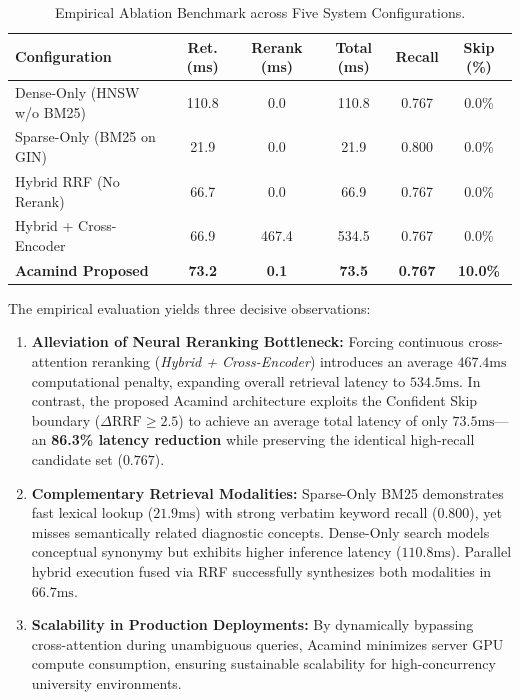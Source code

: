 \documentclass[10pt]{SPIIRAS_Proceedings}
\begin{document}
\begin{table}[!t]
\centering
\caption{Empirical Ablation Benchmark across Five System Configurations.}
\label{tab:ablation}
\scriptsize
\setlength{\tabcolsep}{2.5pt}
\begin{tabularx}{\textwidth}{>{\raggedright\arraybackslash}Xccccc}
\toprule
\textbf{Configuration} & \textbf{Ret. (ms)} & \textbf{Rerank (ms)} & \textbf{Total (ms)} & \textbf{Recall} & \textbf{Skip (\%)} \\
\midrule
Dense-Only (HNSW w/o BM25) & 110.8 & 0.0 & 110.8 & 0.767 & 0.0\% \\
Sparse-Only (BM25 on GIN) & 21.9 & 0.0 & 21.9 & 0.800 & 0.0\% \\
Hybrid RRF (No Rerank) & 66.7 & 0.0 & 66.9 & 0.767 & 0.0\% \\
Hybrid + Cross-Encoder & 66.9 & 467.4 & 534.5 & 0.767 & 0.0\% \\
\midrule
\textbf{Acamind Proposed} & \textbf{73.2} & \textbf{0.1} & \textbf{73.5} & \textbf{0.767} & \textbf{10.0\%} \\
\bottomrule
\end{tabularx}
\end{table}

The empirical evaluation yields three decisive observations:
\begin{enumerate}
    \item \textbf{Alleviation of Neural Reranking Bottleneck:} Forcing continuous cross-attention reranking (\textit{Hybrid + Cross-Encoder}) introduces an average $467.4\text{ms}$ computational penalty, expanding overall retrieval latency to $534.5\text{ms}$. In contrast, the proposed Acamind architecture exploits the Confident Skip boundary ($\Delta\text{RRF} \ge 2.5$) to achieve an average total latency of only $73.5\text{ms}$---an \textbf{86.3\% latency reduction} while preserving the identical high-recall candidate set ($0.767$).
    \item \textbf{Complementary Retrieval Modalities:} Sparse-Only BM25 demonstrates fast lexical lookup ($21.9\text{ms}$) with strong verbatim keyword recall ($0.800$), yet misses semantically related diagnostic concepts. Dense-Only search models conceptual synonymy but exhibits higher inference latency ($110.8\text{ms}$). Parallel hybrid execution fused via RRF successfully synthesizes both modalities in $66.7\text{ms}$.
    \item \textbf{Scalability in Production Deployments:} By dynamically bypassing cross-attention during unambiguous queries, Acamind minimizes server GPU compute consumption, ensuring sustainable scalability for high-concurrency university environments.
\end{enumerate}
\end{document}
